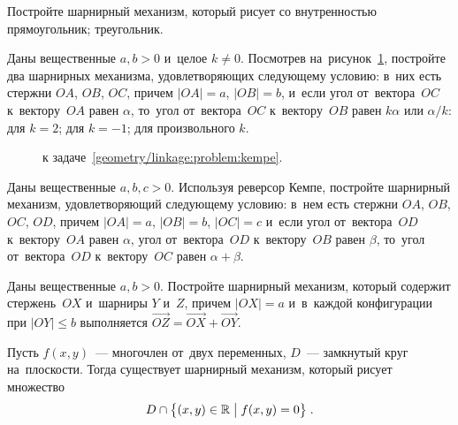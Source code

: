 \begin{problems}

\item
Постройте шарнирный механизм, который рисует со внутренностью
\\
\sp прямоугольник;
\quad
\sp треугольник.

\item{}
\label{geometry/linkage:problem:kempe}%
Даны вещественные $a, b > 0$ и~целое $k \neq 0$.
Посмотрев на~рисунок~\ref{geometry/linkage:problem:kempe:fig},
постройте два шарнирных механизма, удовлетворяющих
следующему условию: в~них есть стержни $OA$, $OB$, $OC$, причем $|OA| = a$,
$|OB| = b$, и~если угол от~вектора~$OC$ к~вектору~$OA$ равен $\alpha$, то~угол
от~вектора~$OC$ к~вектору~$OB$ равен $k \alpha$ или $\alpha / k$:
\\
\sp для $k = 2$;
\quad
\sp для $k = -1$;
\quad
\sp для произвольного $k$.

\begin{figure}[ht]
\begin{center}
    \caption{к задаче~\ref{geometry/linkage:problem:kempe}.}
    \label{geometry/linkage:problem:kempe:fig}
\end{center}
\end{figure}

\item{}
Даны вещественные $a, b, c > 0$.
Используя реверсор Кемпе, постройте шарнирный механизм, удовлетворяющий
следующему условию: в~нем есть стержни $OA$, $OB$, $OC$, $OD$, причем
$|OA| = a$, $|OB| = b$, $|OC| = c$ и~если угол от~вектора~$OD$ к~вектору~$OA$
равен $\alpha$, угол от~вектора~$OD$ к~вектору~$OB$ равен $\beta$, то~угол
от~вектора~$OD$ к~вектору~$OC$ равен $\alpha + \beta$.

\let\ov\overrightarrow

\item{}
Даны вещественные $a, b > 0$.
Постройте шарнирный механизм, который содержит стержень~$OX$ и~шарниры
$Y$ и~$Z$, причем $|OX| = a$ и~в~каждой конфигурации при $|OY| \leq b$
выполняется $\ov{OZ} = \ov{OX} + \ov{OY}$.

\end{problems}

Пусть $f(x, y)$~--- многочлен от~двух переменных, $D$~--- замкнутый круг
на~плоскости.
Тогда существует шарнирный механизм, который рисует множество
\[
    D \cap
    \bigl\{
        (x,y) \in \mathbb{R}
    \bigm|
        f(x, y) = 0
    \bigr\}
\; . \]

